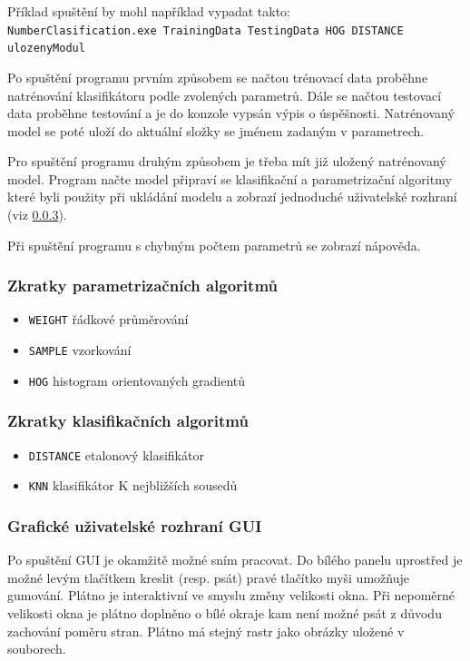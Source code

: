 \documentclass[12pt]{article}
\begin{document}
Příklad spuštění by mohl například vypadat takto:\\
\texttt{NumberClasification.exe TrainingData TestingData HOG DISTANCE ulozenyModul}

Po spuštění programu prvním způsobem se načtou trénovací data proběhne natrénování klasifikátoru podle zvolených parametrů. Dále se načtou testovací data proběhne testování a je do konzole vypsán výpis o úspěšnosti. Natrénovaný model se poté uloží do aktuální složky se jménem zadaným v parametrech.

Pro spuštění programu druhým způsobem je třeba mít již uložený natrénovaný model. Program načte model připraví se klasifikační a parametrizační algoritmy které byli použity při ukládání modelu a zobrazí jednoduché uživatelské rozhraní (viz \ref{GUI}).

Při spuštění programu s chybným počtem parametrů se zobrazí nápověda.

\pagebreak

\subsubsection{Zkratky parametrizačních algoritmů}
\label{Descriptors}
\begin{itemize}
\item \texttt{WEIGHT} řádkové průměrování
\item \texttt{SAMPLE} vzorkování
\item \texttt{HOG} histogram orientovaných gradientů
\end{itemize}

\subsubsection{Zkratky klasifikačních algoritmů}
\label{Classifiers}
\begin{itemize}
\item \texttt{DISTANCE} etalonový klasifikátor
\item \texttt{KNN} klasifikátor K nejbližších sousedů
\end{itemize}

\subsubsection{Grafické uživatelské rozhraní GUI}
\label{GUI}
Po spuštění GUI je okamžitě možné sním pracovat.
Do bílého panelu uprostřed je možné levým tlačítkem kreslit (resp. psát) pravé tlačítko myši umožňuje gumování. Plátno je interaktivní ve smyslu změny velikosti okna. Při nepoměrné velikosti okna je plátno doplněno o bílé okraje kam není možné psát z důvodu zachování poměru stran. Plátno má stejný rastr jako obrázky uložené v souborech.
\end{document}

